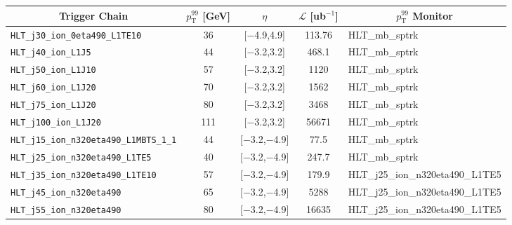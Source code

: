 \documentclass[NOTE, atlasdraft=true, texlive=2020, UKenglish]{atlasdoc}
\newcommand{\PTE}{p_{\text{T}}}
\newcommand{\TN}[1]{ \text{#1} }
\begin{document}
\begin{table}[!ht]
\centering
\begin{tabular}{ | c | c | c | c | c |}
           \hline
           \textbf{Trigger Chain} &  \textbf{$\PTE^{99}$ [GeV]} & \textbf{$\eta$} & \textbf{$\mathscr{L}$ [ub$^{-1}$]} & \textbf{$p_{\TN{T}}^{99}$ Monitor}\\
            \hline
            \multicolumn{1}{|l|}{\texttt{HLT\_j30\_ion\_0eta490\_L1TE10}}   & 36  & [$-$4.9,4.9]   & 113.76 &  \multicolumn{1}{l|}{\scriptsize HLT\_mb\_sptrk} \\
            \hline
            \multicolumn{1}{|l|}{\texttt{HLT\_j40\_ion\_L1J5}}    & 44     & [$-$3.2,3.2]   & 468.1 &  \multicolumn{1}{l|}{\scriptsize HLT\_mb\_sptrk}\\
            \hline
            \multicolumn{1}{|l|}{\texttt{HLT\_j50\_ion\_L1J10}}    & 57    & [$-$3.2,3.2]   & 1120 &  \multicolumn{1}{l|}{\scriptsize HLT\_mb\_sptrk}\\
            \hline
            \multicolumn{1}{|l|}{\texttt{HLT\_j60\_ion\_L1J20}} & 70        & [$-$3.2,3.2]   & 1562 &  \multicolumn{1}{l|}{\scriptsize HLT\_mb\_sptrk}\\
            \hline
            \multicolumn{1}{|l|}{\texttt{HLT\_j75\_ion\_L1J20}}   & 80  & [$-$3.2,3.2]   & 3468 &  \multicolumn{1}{l|}{\scriptsize HLT\_mb\_sptrk}\\
            \hline
            \multicolumn{1}{|l|}{\texttt{HLT\_j100\_ion\_L1J20}}   & 111 & [$-$3.2,3.2]   & 56671 &  \multicolumn{1}{l|}{\scriptsize HLT\_mb\_sptrk}\\
            \hline
            \multicolumn{1}{|l|}{\texttt{HLT\_j15\_ion\_n320eta490\_L1MBTS\_1\_1}}   & 44  & [$-$3.2,$-$4.9]   & 77.5 &  \multicolumn{1}{l|}{\scriptsize HLT\_mb\_sptrk}\\
            \hline
            \multicolumn{1}{|l|}{\texttt{HLT\_j25\_ion\_n320eta490\_L1TE5}}   & 40  & [$-$3.2,$-$4.9]   & 247.7 &  \multicolumn{1}{l|}{\scriptsize HLT\_mb\_sptrk}\\
            \hline
            \multicolumn{1}{|l|}{\texttt{HLT\_j35\_ion\_n320eta490\_L1TE10}}   & 57  & [$-$3.2,$-$4.9]   & 179.9 &  \multicolumn{1}{l|}{\tiny HLT\_j25\_ion\_n320eta490\_L1TE5}\\
            \hline
            \multicolumn{1}{|l|}{\texttt{HLT\_j45\_ion\_n320eta490}}   & 65  & [$-$3.2,$-$4.9]   & 5288 &  \multicolumn{1}{l|}{\tiny HLT\_j25\_ion\_n320eta490\_L1TE5}\\
            \hline
            \multicolumn{1}{|l|}{\texttt{HLT\_j55\_ion\_n320eta490}}   & 80  & [$-$3.2,$-$4.9]   & 16635 &  \multicolumn{1}{l|}{\tiny HLT\_j25\_ion\_n320eta490\_L1TE5}\\

\end{tabular}
\end{table}
\end{document}
